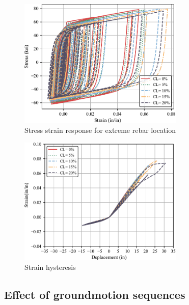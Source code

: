 \begin{figure}[htbp]
	\centering
	\includegraphics[width=0.7\textwidth]{Chapter-5/figs/Stress_Strain_RSN1505.pdf}
	\caption{Stress strain response for extreme rebar location}
	\label{fig:Steel_Stress_Strain_Response}
\end{figure}

\begin{figure}[htbp]
	\centering
	\includegraphics[width=0.7\textwidth]{Chapter-5/figs/Diplacement_Strain_RSN1505.pdf}
	\caption{Strain hysteresis}
	\label{fig:Steel_Stress_Strain_Response}
\end{figure}

\subsection{Effect of groundmotion sequences}

